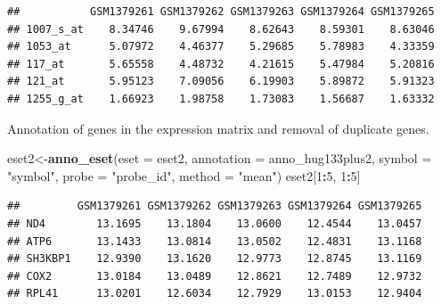 \documentclass[
  12pt,
]{book}
\newenvironment{Shaded}{\begin{snugshade}}{\end{snugshade}}
\newcommand{\AttributeTok}[1]{\textcolor[rgb]{0.13,0.29,0.53}{#1}}
\newcommand{\DecValTok}[1]{\textcolor[rgb]{0.00,0.00,0.81}{#1}}
\newcommand{\FunctionTok}[1]{\textcolor[rgb]{0.13,0.29,0.53}{\textbf{#1}}}
\newcommand{\NormalTok}[1]{#1}
\newcommand{\OtherTok}[1]{\textcolor[rgb]{0.56,0.35,0.01}{#1}}
\newcommand{\SpecialCharTok}[1]{\textcolor[rgb]{0.81,0.36,0.00}{\textbf{#1}}}
\newcommand{\StringTok}[1]{\textcolor[rgb]{0.31,0.60,0.02}{#1}}
\theoremstyle{definition}
\theoremstyle{definition}
\theoremstyle{definition}
\theoremstyle{definition}
\theoremstyle{remark}
\begin{document}
\begin{verbatim}
##           GSM1379261 GSM1379262 GSM1379263 GSM1379264 GSM1379265
## 1007_s_at    8.34746    9.67994    8.62643    8.59301    8.63046
## 1053_at      5.07972    4.46377    5.29685    5.78983    4.33359
## 117_at       5.65558    4.48732    4.21615    5.47984    5.20816
## 121_at       5.95123    7.09056    6.19903    5.89872    5.91323
## 1255_g_at    1.66923    1.98758    1.73083    1.56687    1.63332
\end{verbatim}

Annotation of genes in the expression matrix and removal of duplicate genes.

\begin{Shaded}
\begin{Highlighting}[]
\NormalTok{eset2}\OtherTok{\textless{}{-}}\FunctionTok{anno\_eset}\NormalTok{(}\AttributeTok{eset       =}\NormalTok{ eset2,}
                 \AttributeTok{annotation =}\NormalTok{ anno\_hug133plus2,}
                 \AttributeTok{symbol     =} \StringTok{"symbol"}\NormalTok{,}
                 \AttributeTok{probe      =} \StringTok{"probe\_id"}\NormalTok{,}
                 \AttributeTok{method     =} \StringTok{"mean"}\NormalTok{)}
\NormalTok{eset2[}\DecValTok{1}\SpecialCharTok{:}\DecValTok{5}\NormalTok{, }\DecValTok{1}\SpecialCharTok{:}\DecValTok{5}\NormalTok{]}
\end{Highlighting}
\end{Shaded}

\begin{verbatim}
##         GSM1379261 GSM1379262 GSM1379263 GSM1379264 GSM1379265
## ND4        13.1695    13.1804    13.0600    12.4544    13.0457
## ATP6       13.1433    13.0814    13.0502    12.4831    13.1168
## SH3KBP1    12.9390    13.1620    12.9773    12.8745    13.1169
## COX2       13.0184    13.0489    12.8621    12.7489    12.9732
## RPL41      13.0201    12.6034    12.7929    13.0153    12.9404
\end{verbatim}
\end{document}
